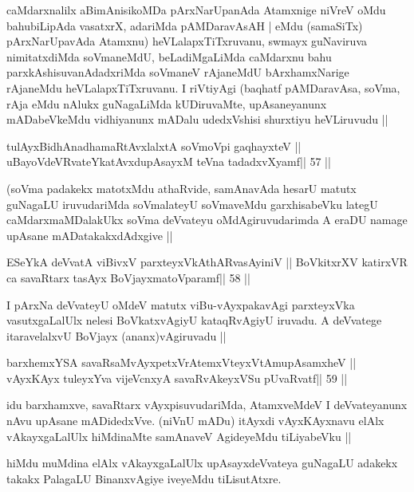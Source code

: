 \begin{artha}
caMdarxnalilx aBimAnisikoMDa pArxNarUpanAda Atamxnige niVreV oMdu bahubiLipAda vasatxrX, adariMda pAMDaravAsAH | eMdu (samaSiTx) pArxNarUpavAda Atamxnu) heVLalapxTiTxruvanu, swmayx guNaviruva nimitatxdiMda soVmaneMdU, beLadiMgaLiMda caMdarxnu bahu parxkAshisuvanAdadxriMda soVmaneV rAjaneMdU bArxhamxNarige rAjaneMdu heVLalapxTiTxruvanu. I riVtiyAgi (baqhatf pAMDaravAsa, soVma, rAja eMdu nAlukx guNagaLiMda kUDiruvaMte, upAsaneyanunx mADabeVkeMdu vidhiyanunx mADalu udedxVshisi shurxtiyu heVLiruvudu ||
\end{artha}

\begin{shl}
tulAyxBidhAnadhamaRtAvxlalxtA soVmoV\s pi gaqhayxteV ||
uBayoVdeVRvateYkatAvxdupAsayxM teVna tadadxvXyamf\hfill || 57 ||
\end{shl}

\begin{artha}
(soVma padakekx matotxMdu athaRvide, samAnavAda hesarU matutx guNagaLU iruvudariMda soVmalateyU soVmaveMdu garxhisabeVku lategU caMdarxmaMDalakUkx soVma deVvateyu oMdAgiruvudarimda A eraDU namage upAsane mADatakakxdAdxgive ||
\end{artha}

\begin{shl}
ESeYkA deVvatA viBivxV parxteyxVkAthARvasAyiniV ||
BoVkitxrXV katirxVR ca savaRtarx tasAyx BoVjayxmatoV\s paramf\hfill || 58 ||
\end{shl}

\begin{artha}
I pArxNa deVvateyU oMdeV matutx viBu-vAyxpakavAgi parxteyxVka vasutxgaLalUlx nelesi BoVkatxvAgiyU kataqRvAgiyU iruvadu. A deVvatege itaravelalxvU BoVjayx (ananx)vAgiruvadu ||
\end{artha}

\begin{shl}
barxhemxYSA savaRsaMvAyxpetxVrAtemxVteyxVtAmupAsamxheV ||
vAyxKAyx tuleyxYva vijeVcnxyA savaRvAkeyxVSu pUvaRvatf\hfill || 59 ||
\end{shl}

\begin{artha}
idu barxhamxve, savaRtarx vAyxpisuvudariMda, AtamxveMdeV I deVvateyanunx nAvu upAsane mADidedxVve. (niVnU mADu) itAyxdi vAyxKAyxnavu elAlx vAkayxgaLalUlx hiMdinaMte samAnaveV AgideyeMdu tiLiyabeVku ||
\end{artha}

\begin{artha}
hiMdu muMdina elAlx vAkayxgaLalUlx upAsayxdeVvateya guNagaLU adakekx takakx PalagaLU BinanxvAgiye iveyeMdu tiLisutAtxre.
\end{artha}

